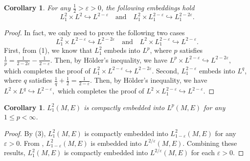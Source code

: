 \documentclass[a4paper]{amsart}
\newtheorem{cor}[theorem]{Corollary}
\theoremstyle{definition}
\theoremstyle{remark}
\numberwithin{equation}{section}
\begin{document}
\begin{cor}\label{SobM}
For any $\frac{1}{2} > \varepsilon > 0$, the following embeddings hold
\[
L_1^2 \times L^2 \hookrightarrow L^{2-\varepsilon}
\quad \text{and} \quad
L_1^2 \times L_1^{2-\varepsilon} \hookrightarrow L_1^{2-2\varepsilon}.
\]
\end{cor}

\begin{proof}
In fact, we only need to prove the following two cases
\[
L_1^2 \times L^{2-\varepsilon} \hookrightarrow L^{2-2\varepsilon} \quad \text{and} \quad L^2 \times L_1^{2-\varepsilon} \hookrightarrow L^{2-\varepsilon}.
\]
First, from (1), we know that $L_1^2$ embeds into $L^p$, where $p$ satisfies $\frac{1}{p} = \frac{1}{2-2\varepsilon} - \frac{1}{2-\varepsilon}.$ Then, by Hölder's inequality, we have $L^p \times L^{2-\varepsilon} \hookrightarrow L^{2-2\varepsilon},$ which completes the proof of $L_1^2 \times L^{2-\varepsilon} \hookrightarrow L^{2-2\varepsilon}$. Second, $L_1^{2-\varepsilon}$ embeds into $L^q$, where $q$ satisfies $\frac{1}{q} + \frac{1}{2} = \frac{1}{2-\varepsilon}.$ Then, by Hölder's inequality, we have $L^2 \times L^q \hookrightarrow L^{2-\varepsilon},$ which completes the proof of $L^2 \times L_1^{2-\varepsilon} \hookrightarrow L^{2-\varepsilon}$. 
\end{proof}

\begin{cor}
$L_1^2(M, E)$ is compactly embedded into $L^p(M, E)$ for any $1 \leq p < \infty$.
\end{cor}

\begin{proof}
By (3), $L_1^2(M, E)$ is compactly embedded into $L_{1-\varepsilon}^2(M, E)$ for any $\varepsilon > 0$. From \cite[]{di2012hitchhikerʼs}, $L_{1-\varepsilon}^2(M, E)$ is embedded into $L^{2/\varepsilon}(M, E)$. Combining these results, $L_1^2(M, E)$ is compactly embedded into $L^{2/\varepsilon}(M, E)$ for each $\varepsilon > 0$. 
\end{proof}
\end{document}
